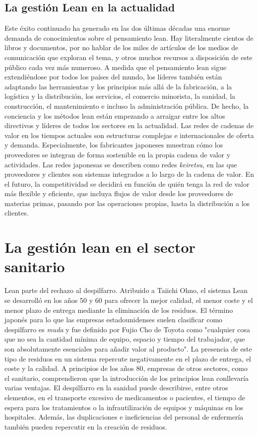 \subsection{La gestión Lean en la actualidad}

Este éxito continuado ha generado en las dos últimas décadas una enorme demanda de conocimientos sobre el pensamiento lean.
Hay literalmente cientos de libros y documentos, por no hablar de los miles de artículos de los medios de comunicación que exploran el tema, y otros muchos recursos a disposición de este público cada vez más numeroso.
A medida que el pensamiento lean sigue extendiéndose por todos los países del mundo, los líderes también están adaptando las herramientas y los principios más allá de la fabricación, a la logística y la distribución, los servicios, el comercio minorista, la sanidad, la construcción, el mantenimiento e incluso la administración pública.
De hecho, la conciencia y los métodos lean están empezando a arraigar entre los altos directivos y líderes de todos los sectores en la actualidad.
Las redes de cadenas de valor en los tiempos actuales son estructuras complejas e internacionales de oferta y demanda.
Especialmente, los fabricantes japoneses muestran cómo los proveedores se integran de forma sostenible en la propia cadena de valor y actividades.
Las redes japonesas se describen como redes \textit{keiretsu}, en las que proveedores y clientes son sistemas integrados a lo largo de la cadena de valor.
En el futuro, la competitividad se decidirá en función de quién tenga la red de valor más flexible y eficiente, que incluya flujos de valor desde los proveedores de materias primas, pasando por las operaciones propias, hasta la distribución a los clientes.

\section{La gestión lean en el sector sanitario}

Lean parte del rechazo al despilfarro. Atribuido a Taiichi Ohno, el sistema Lean se desarrolló en los años 50 y 60 para ofrecer la mejor calidad, el menor coste y el menor plazo de entrega mediante la eliminación de los residuos. El término japonés para lo que las empresas estadounidenses suelen clasificar como despilfarro es \textit{muda} y fue definido por Fujio Cho de Toyota como "cualquier cosa que no sea la cantidad mínima de equipo, espacio y tiempo del trabajador, que son absolutamente esenciales para añadir valor al producto". La presencia de este tipo de residuos en un sistema repercute negativamente en el plazo de entrega, el coste y la calidad. A principios de los años 80, empresas de otros sectores, como el sanitario, comprendieron que la introducción de los principios lean conllevaría varias ventajas. El despilfarro en la sanidad puede describirse, entre otros elementos, en el transporte excesivo de medicamentos o pacientes, el tiempo de espera para los tratamientos o la infrautilización de equipos y máquinas en los hospitales. Además, las duplicaciones e ineficiencias del personal de enfermería también pueden repercutir en la creación de residuos.

